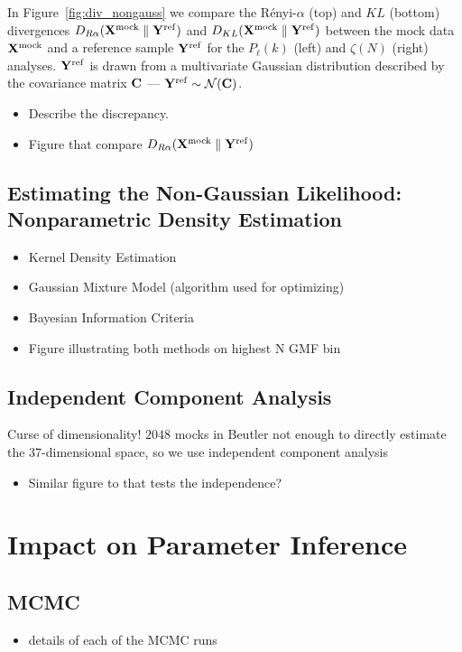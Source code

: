 \documentclass[12pt, letterpaper, preprint]{aastex}
\newcommand{\bitem}{\begin{itemize}}
\newcommand{\eitem}{\end{itemize}}
\begin{document}
In Figure~\ref{fig:div_nongauss} we compare the R\'enyi-$\alpha$ 
(top) and $KL$ (bottom) divergences
$D_{R\alpha}({\bf X}^\mathrm{mock} \parallel {\bf Y}^\mathrm{ref})$ and 
$D_{KL}({\bf X}^\mathrm{mock} \parallel {\bf Y}^\mathrm{ref})$
between the mock data ${\bf X}^\mathrm{mock}$ and a reference sample 
${\bf Y}^\mathrm{ref}$ for the $P_\ell(k)$ (left) and $\zeta(N)$ (right) analyses.
${\bf Y}^\mathrm{ref}$ is drawn from a multivariate Gaussian distribution 
described by the covariance matrix ${\bf C}$ --- 
${\bf Y}^\mathrm{ref} \sim \mathcal{N}({\bf C})$. 
\bitem 
    \item Describe the discrepancy. 
    \item Figure that compare $D_{R\alpha}({\bf X}^\mathrm{mock} \parallel {\bf Y}^\mathrm{ref})$
\eitem

\subsection{Estimating the Non-Gaussian Likelihood: Nonparametric Density Estimation}
\bitem
    \item Kernel Density Estimation 
    \item Gaussian Mixture Model (algorithm used for optimizing) 
    \item Bayesian Information Criteria 
    \item Figure illustrating both methods on highest N GMF bin 
\eitem

\subsection{Independent Component Analysis} 
Curse of dimensionality! $2048$ mocks in Beutler not enough to directly estimate 
the 37-dimensional space, so we use independent component analysis 
\cite{hartlap2009}
\bitem
    \item Similar figure to \cite{hartlap2009} that tests the independence? 
\eitem

\section{Impact on Parameter Inference}
\subsection{MCMC}
\bitem
    \item details of each of the MCMC runs
\eitem
\end{document}
